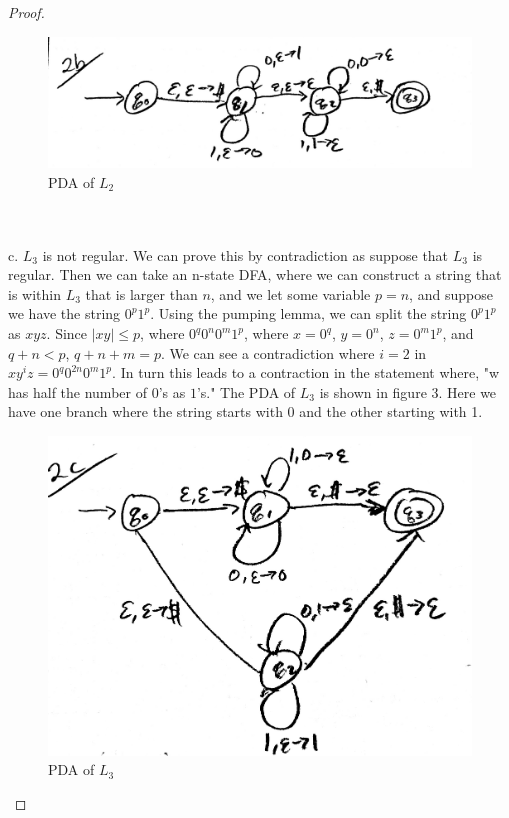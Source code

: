 \documentclass[12pt]{article}
\begin{document}
\begin{proof}
\begin{figure}
  \includegraphics[width=\linewidth]{2b.png}
  \caption{PDA of $L_{2}$}
\end{figure} \\ \\
c. $L_{3}$ is not regular. We can prove this by contradiction as suppose that $L_{3}$ is regular. Then we can take an n-state DFA, where we can construct a string that is within $L_{3}$ that is larger than $n$, and we let some variable $p = n$, and suppose we have the string $0^{p}1^{p}$. Using the pumping lemma, we can split the string $0^{p}1^{p}$ as $xyz$. Since $|xy| \leq p$, where $0^{q}0^{n}0^{m}1^{p}$, where $x = 0^{q}$, $y = 0^{n}$, $z = 0^{m}1^{p}$, and $q + n < p$, $q + n + m = p$. We can see a contradiction where $i = 2$ in $xy^{i}z = 0^{q}0^{2n}0^{m}1^{p}$. In turn this leads to a contraction in the statement where, "w has half the number of $0$'s as $1$'s." The PDA of $L_{3}$ is shown in figure 3. Here we have one branch where the string starts with 0 and the other starting with 1. 
\begin{figure}
  \includegraphics[width=\linewidth]{2c.png}
  \caption{PDA of $L_{3}$}
\end{figure}

\end{proof}
\end{document}
